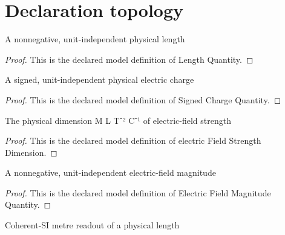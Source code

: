 \section{Declaration topology}
\begin{definition}
  \label{def:physics:phyx-mini-0913:phyxminiproblems-problemphyxmini0913-lengthquantity}
  A nonnegative, unit-independent physical length
\end{definition}
\begin{proof}
  This is the declared model definition of Length Quantity.
\end{proof}
\begin{definition}
  \label{def:physics:phyx-mini-0913:phyxminiproblems-problemphyxmini0913-signedchargequantity}
  A signed, unit-independent physical electric charge
\end{definition}
\begin{proof}
  This is the declared model definition of Signed Charge Quantity.
\end{proof}
\begin{definition}
  \label{def:physics:phyx-mini-0913:phyxminiproblems-problemphyxmini0913-electricfieldstrengthdimension}
  The physical dimension M L T⁻² C⁻¹ of electric-field strength
\end{definition}
\begin{proof}
  This is the declared model definition of electric Field Strength Dimension.
\end{proof}
\begin{definition}
  \label{def:physics:phyx-mini-0913:phyxminiproblems-problemphyxmini0913-electricfieldmagnitudequantity}
  A nonnegative, unit-independent electric-field magnitude
\end{definition}
\begin{proof}
  This is the declared model definition of Electric Field Magnitude Quantity.
\end{proof}
\begin{definition}
  \label{def:physics:phyx-mini-0913:phyxminiproblems-problemphyxmini0913-lengthinmeters}
  Coherent-SI metre readout of a physical length
\end{definition}
